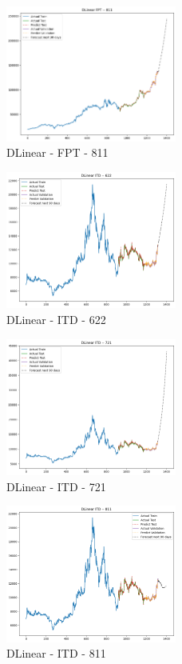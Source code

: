\documentclass{ieeeojies}
\begin{document}
\begin{figure} [H]
    \centering
    \includegraphics[width=0.5\textwidth]{bibliography/Figure/DLinear_FPT_811_90.png}
    \caption{DLinear - FPT - 811}
    \label{fig:DLinear_FPT_811_90}
\end{figure}
\begin{figure} [H]
    \centering
    \includegraphics[width=0.5\textwidth]{bibliography/Figure/DLinear_ITD_622_90.png}
    \caption{DLinear - ITD - 622}
    \label{fig:DLinear_ITD_622_90}
\end{figure}
\begin{figure} [H]
    \centering
    \includegraphics[width=0.5\textwidth]{bibliography/Figure/DLinear_ITD_721_90.png}
    \caption{DLinear - ITD - 721}
    \label{fig:DLinear_ITD_721_90}
\end{figure}
\begin{figure} [H]
    \centering
    \includegraphics[width=0.5\textwidth]{bibliography/Figure/DLinear_ITD_811_90.png}
    \caption{DLinear - ITD - 811}
    \label{fig:DLinear_ITD_811_90}
\end{figure}
\end{document}

